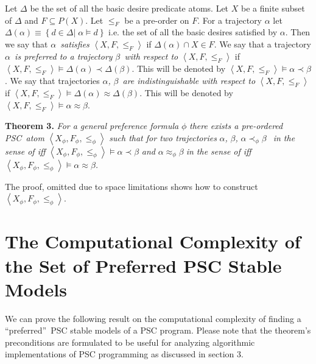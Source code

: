 \documentclass[letterpaper]{article}\usepackage{aaai}
\begin{document}
Let $\Delta$ be the set of all the basic desire predicate atoms. Let $X$ be a
finite subset of $\Delta$ and $F\subseteq P\left(  X\right)  $. Let $\leq_{F}$
be a pre-order on $F$. For a trajectory $\alpha$ let $\Delta\left(
\alpha\right)  \equiv\left\{  d\in\Delta|\;\alpha\models d\right\}  $ i.e. the
set of all the basic desires satisfied by $\alpha$. Then we say that $\alpha
$\emph{\ satisfies }$\left\langle X,F,\leq_{F}\right\rangle $ if
$\Delta\left(  \alpha\right)  \cap X\in F$. We say that a trajectory $\alpha
$\emph{\ is preferred to a trajectory }$\beta$\emph{\ with respect to
}$\left\langle X,F,\leq_{F}\right\rangle $ if $\left\langle X,F,\leq
_{F}\right\rangle \models\Delta\left(  \alpha\right)  \prec\Delta\left(
\beta\right)  $. This will be denoted by $\left\langle X,F,\leq_{F}\right\rangle \models\alpha\prec\beta$. We say that trajectories $\alpha
$\emph{, }$\beta$\emph{\ are indistinguishable with respect to }$\left\langle
X,F,\leq_{F}\right\rangle $ if $\left\langle X,F,\leq_{F}\right\rangle
\models\Delta\left(  \alpha\right)  \approx\Delta\left(  \beta\right)  $. This
will be denoted by $\left\langle X,F,\leq_{F}\right\rangle \models
\alpha\approx\beta$.

\textbf{Theorem 3. }\textit{For a general preference formula }$\phi$
\textit{there exists a pre-ordered PSC\ atom }$\left\langle X_{\phi},F_{\phi
},\leq_{\phi}\right\rangle $\textit{ such that for two trajectories }$\alpha
$\textit{, }$\beta$\textit{, }$\alpha\prec_{\phi}\beta\;$\textit{\ in the
sense of \cite{SP} iff }$\left\langle X_{\phi},F_{\phi},\leq_{\phi
}\right\rangle \models\alpha\prec\beta$\textit{ and }$\alpha\approx_{\phi
}\beta\;$\textit{in the sense of \cite{SP} iff }$\left\langle X_{\phi},F_{\phi},\leq_{\phi}\right\rangle \models\alpha\approx\beta$\textit{.}

The proof, omitted due to space limitations shows how to construct
$\left\langle X_{\phi},F_{\phi},\leq_{\phi}\right\rangle $.

\section{\label{complexity}The Computational Complexity of the Set of
Preferred PSC Stable Models}

We can prove the following result on the computational complexity of finding a
\textquotedblleft preferred\textquotedblright\ PSC stable models of a PSC
program. Please note that the theorem's preconditions are formulated to be
useful for analyzing algorithmic implementations of PSC programming as
discussed in section 3.
\end{document}
